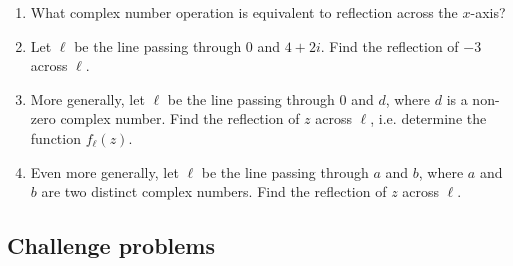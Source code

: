 \begin{enumerate}
\begin{enumerate}
\item What complex number operation is equivalent to reflection across the $x$-axis?
\item Let $\ell$ be the line passing through $0$ and $4 + 2i$. Find the reflection of $-3$ across $\ell$.
\item More generally, let $\ell$ be the line passing through $0$ and $d$, where $d$ is a non-zero complex number. Find the reflection of $z$ across $\ell$, i.e. determine the function $f_{\ell}(z)$.
\item Even more generally, let $\ell$ be the line passing through $a$ and $b$, where $a$ and $b$ are two distinct complex numbers. Find the reflection of $z$ across $\ell$.
\end{enumerate}
\end{enumerate}


\subsection{Challenge problems}

